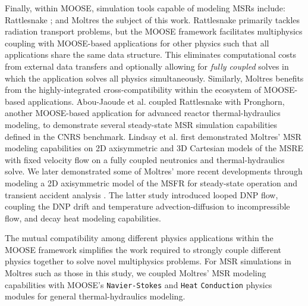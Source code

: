 Finally, within MOOSE,
simulation tools capable of modeling
\glspl{MSR} include: Rattlesnake \cite{wang_rattlesnake_2021}; and Moltres
\cite{lindsay_moltres_2017}\textemdash the subject of this work.
Rattlesnake primarily tackles radiation transport problems, but the MOOSE
framework facilitates multiphysics coupling
with MOOSE-based applications for other physics
such that all applications share the same data structure. This eliminates
computational costs from external data transfers and optionally allowing for
\textit{fully coupled} solves in which the application solves all physics
simultaneously. Similarly, Moltres benefits from the highly-integrated
cross-compatibility
within the ecosystem of MOOSE-based applications. Abou-Jaoude et al.
\cite{abou-jaoude_coupled_2020} coupled Rattlesnake with Pronghorn, another
MOOSE-based application for advanced reactor thermal-hydraulics modeling, to
demonstrate several steady-state \gls{MSR} simulation capabilities defined in
the CNRS benchmark. Lindsay et al.
\cite{lindsay_introduction_2018} first demonstrated Moltres' \gls{MSR} modeling
capabilities on 2D axisymmetric and 3D Cartesian models of the \gls{MSRE} with
fixed velocity flow on a fully coupled neutronics and thermal-hydraulics solve.
We later demonstrated some of Moltres' more recent developments through
modeling a 2D axisymmetric model of the \gls{MSFR} for steady-state operation
and transient accident analysis \cite{park_advancement_2020}. The latter study
introduced looped \gls{DNP} flow, coupling the \gls{DNP} drift and temperature 
advection-diffusion to incompressible flow, and decay heat modeling
capabilities.

The mutual compatibility among different physics applications within the
\gls{MOOSE} framework simplifies the work required to strongly couple
different physics together to solve novel multiphysics problems. For \gls{MSR}
simulations in Moltres such as those in this study, we coupled Moltres'
\gls{MSR} modeling capabilities with \gls{MOOSE}'s \texttt{Navier-Stokes} and
\texttt{Heat} \texttt{Conduction} physics modules \cite{peterson_overview_2018}
for general thermal-hydraulics modeling.

